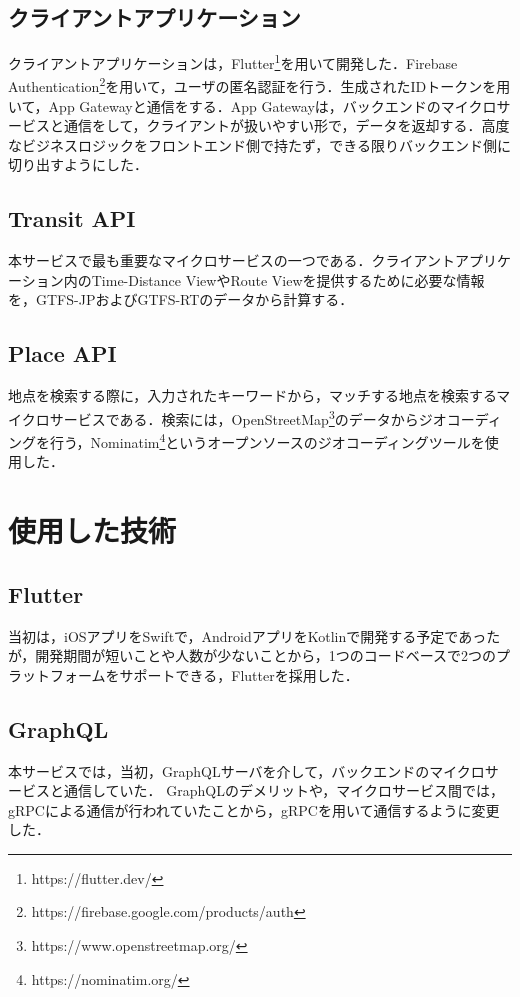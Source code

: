 \subsection{クライアントアプリケーション}
クライアントアプリケーションは，Flutter\footnote{https://flutter.dev/}を用いて開発した．Firebase Authentication\footnote{https://firebase.google.com/products/auth}を用いて，ユーザの匿名認証を行う．生成されたIDトークンを用いて，App Gatewayと通信をする．App Gatewayは，バックエンドのマイクロサービスと通信をして，クライアントが扱いやすい形で，データを返却する．高度なビジネスロジックをフロントエンド側で持たず，できる限りバックエンド側に切り出すようにした．

\subsection{Transit API}
本サービスで最も重要なマイクロサービスの一つである．クライアントアプリケーション内のTime-Distance ViewやRoute Viewを提供するために必要な情報を，GTFS-JPおよびGTFS-RTのデータから計算する．

\subsection{Place API}
地点を検索する際に，入力されたキーワードから，マッチする地点を検索するマイクロサービスである．検索には，OpenStreetMap\footnote{https://www.openstreetmap.org/}のデータからジオコーディングを行う，Nominatim\footnote{https://nominatim.org/}というオープンソースのジオコーディングツールを使用した．

\section{使用した技術}
\subsection{Flutter}
当初は，iOSアプリをSwiftで，AndroidアプリをKotlinで開発する予定であったが，開発期間が短いことや人数が少ないことから，1つのコードベースで2つのプラットフォームをサポートできる，Flutterを採用した．

\subsection{GraphQL}
本サービスでは，当初，GraphQLサーバを介して，バックエンドのマイクロサービスと通信していた．
GraphQLのデメリットや，マイクロサービス間では，gRPCによる通信が行われていたことから，gRPCを用いて通信するように変更した．

